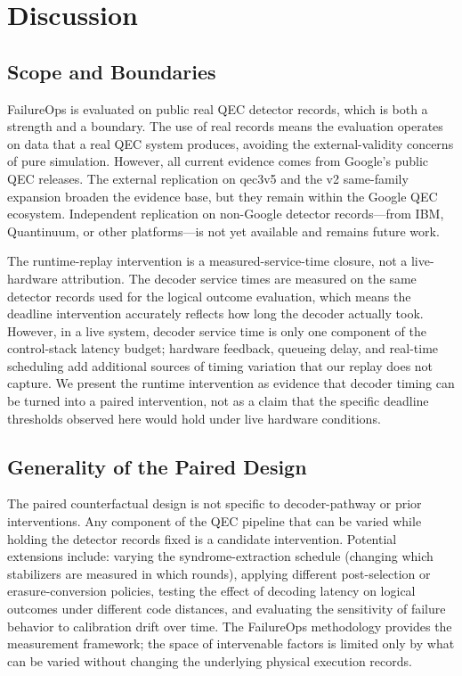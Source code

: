 \section{Discussion}

\subsection{Scope and Boundaries}

FailureOps is evaluated on public real QEC detector records, which is both a strength and a boundary. The use of real records means the evaluation operates on data that a real QEC system produces, avoiding the external-validity concerns of pure simulation. However, all current evidence comes from Google's public QEC releases. The external replication on qec3v5 and the v2 same-family expansion broaden the evidence base, but they remain within the Google QEC ecosystem. Independent replication on non-Google detector records---from IBM, Quantinuum, or other platforms---is not yet available and remains future work.

The runtime-replay intervention is a measured-service-time closure, not a live-hardware attribution. The decoder service times are measured on the same detector records used for the logical outcome evaluation, which means the deadline intervention accurately reflects how long the decoder actually took. However, in a live system, decoder service time is only one component of the control-stack latency budget; hardware feedback, queueing delay, and real-time scheduling add additional sources of timing variation that our replay does not capture. We present the runtime intervention as evidence that decoder timing can be turned into a paired intervention, not as a claim that the specific deadline thresholds observed here would hold under live hardware conditions.

\subsection{Generality of the Paired Design}

The paired counterfactual design is not specific to decoder-pathway or prior interventions. Any component of the QEC pipeline that can be varied while holding the detector records fixed is a candidate intervention. Potential extensions include: varying the syndrome-extraction schedule (changing which stabilizers are measured in which rounds), applying different post-selection or erasure-conversion policies, testing the effect of decoding latency on logical outcomes under different code distances, and evaluating the sensitivity of failure behavior to calibration drift over time. The FailureOps methodology provides the measurement framework; the space of intervenable factors is limited only by what can be varied without changing the underlying physical execution records.

